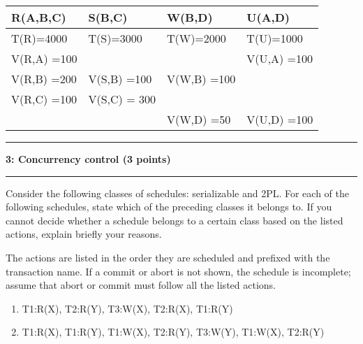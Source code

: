 \documentclass[11pt]{article}
\newcommand\question[2]{\vspace{.25in}\hrule\textbf{#1: #2}\vspace{.5em}\hrule\vspace{.10in}}
\begin{document}
		
\begin{tabular}{ |l| l | l|l|}
\hline
  R(A,B,C) & S(B,C) & W(B,D) & U(A,D) \\\hline
  T(R)=4000 & T(S)=3000& T(W)=2000 & T(U)=1000 \\\hline
  V(R,A) =100 &  & & V(U,A) =100\\
  V(R,B) =200 & V(S,B) =100& V(W,B) =100& \\
  V(R,C) =100 & V(S,C) = 300&&\\
  & & V(W,D) =50 & V(U,D) =100\\\hline
\end{tabular}





\question{3}{Concurrency control (3 points)}
Consider the following classes of schedules: serializable and 2PL. 
For each of the following schedules, state which of the preceding classes it belongs to. 
If you cannot decide whether a schedule belongs to a certain class based on the listed actions, explain briefly your reasons.

The actions are listed in the order they are scheduled and prefixed with the transaction name. 
If a commit or abort is not shown, the schedule is incomplete; assume that abort or commit must follow all the listed actions.


\begin{enumerate}
\item T1:R(X), T2:R(Y), T3:W(X), T2:R(X), T1:R(Y)
\item T1:R(X), T1:R(Y), T1:W(X), T2:R(Y), T3:W(Y), T1:W(X), T2:R(Y)
\end{enumerate}
\end{document}
